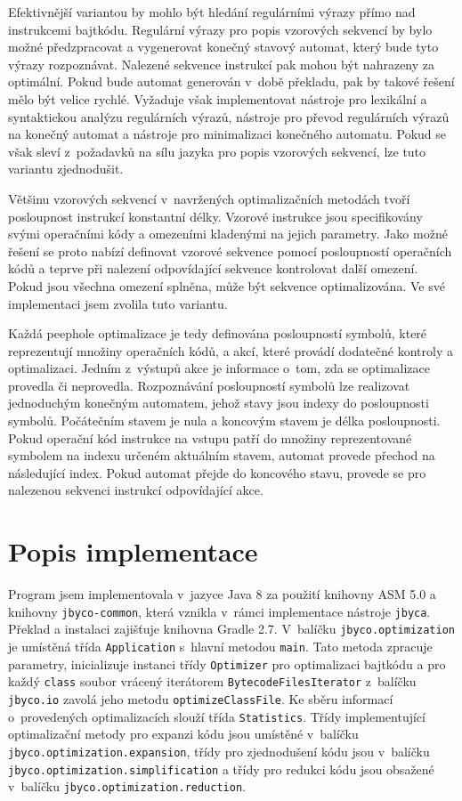 Efektivnější variantou by mohlo být hledání regulárními výrazy přímo nad instrukcemi bajtkódu. Regulární výrazy pro popis vzorových sekvencí by bylo možné předzpracovat a vygenerovat konečný stavový automat, který bude tyto výrazy rozpoznávat. Nalezené sekvence instrukcí pak mohou být nahrazeny za optimální. Pokud bude automat generován v~době překladu, pak by takové řešení mělo být velice rychlé. Vyžaduje však implementovat nástroje pro lexikální a syntaktickou analýzu regulárních výrazů, nástroje pro převod regulárních výrazů na konečný automat a nástroje pro minimalizaci konečného automatu. Pokud se však sleví z~požadavků na sílu jazyka pro popis vzorových sekvencí, lze tuto variantu zjednodušit.

Většinu vzorových sekvencí v~navržených optimalizačních metodách tvoří posloupnost instrukcí konstantní délky. Vzorové instrukce jsou specifikovány svými operačními kódy a omezeními kladenými na jejich parametry. Jako možné řešení se proto nabízí definovat vzorové sekvence pomocí posloupností operačních kódů a teprve při nalezení odpovídající sekvence kontrolovat další omezení. Pokud jsou všechna omezení splněna, může být sekvence optimalizována. Ve své implementaci jsem zvolila tuto variantu. 

Každá peephole optimalizace je tedy definována posloupností symbolů, které reprezentují množiny operačních kódů, a akcí, které provádí dodatečné kontroly a optimalizaci. Jedním z~výstupů akce je informace o~tom, zda se optimalizace provedla či neprovedla.
Rozpoznávání posloupností symbolů lze realizovat jednoduchým konečným automatem, jehož stavy jsou indexy do posloupnosti symbolů. Počátečním stavem je nula a koncovým stavem je délka posloupnosti. Pokud operační kód instrukce na vstupu patří do množiny reprezentované symbolem na indexu určeném aktuálním stavem, automat provede přechod na následující index. Pokud automat přejde do koncového stavu, provede se pro nalezenou sekvenci instrukcí odpovídající akce.

\section{Popis implementace}

Program jsem implementovala v~jazyce Java 8 za použití knihovny ASM 5.0 a knihovny \texttt{jbyco-common}, která vznikla v~rámci implementace nástroje \texttt{jbyca}. Překlad a instalaci zajišťuje knihovna Gradle 2.7. V~balíčku \texttt{jbyco.optimization} je umístěná třída \texttt{Application} s~hlavní metodou \texttt{main}. Tato metoda zpracuje parametry, inicializuje instanci třídy \texttt{Optimizer} pro optimalizaci bajtkódu a pro každý \texttt{class} soubor vrácený iterátorem \texttt{BytecodeFilesIterator} z~balíčku \texttt{jbyco.io} zavolá jeho metodu \texttt{optimizeClassFile}. Ke sběru informací o~provedených optimalizacích slouží třída \texttt{Statistics}. Třídy implementující optimalizační metody pro expanzi kódu jsou umístěné v~balíčku \texttt{jbyco.optimization.expansion}, třídy pro zjednodušení kódu jsou v~balíčku \texttt{jbyco.optimization.simplification} a třídy pro redukci kódu jsou obsažené v~balíčku \texttt{jbyco.optimization.reduction}.

